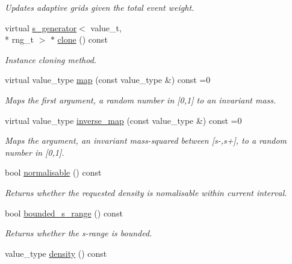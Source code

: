 \begin{DoxyCompactItemize}
\begin{DoxyCompactList}\small\item\em Updates adaptive grids given the total event weight. \end{DoxyCompactList}\item 
virtual \hyperlink{a00482}{s\-\_\-generator}$<$ value\-\_\-t, \\*
rng\-\_\-t $>$ $\ast$ \hyperlink{a00482_afd0da9539aa5f4e672e05e146fb09258}{clone} () const 
\begin{DoxyCompactList}\small\item\em Instance cloning method. \end{DoxyCompactList}\item 
virtual value\-\_\-type \hyperlink{a00482_a2b34a08ad07cf08d3d91fc6edb91eb0b}{map} (const value\-\_\-type \&) const =0
\begin{DoxyCompactList}\small\item\em Maps the first argument, a random number in \mbox{[}0,1\mbox{]} to an invariant mass. \end{DoxyCompactList}\item 
virtual value\-\_\-type \hyperlink{a00482_a5853a3d32e5a0901985040914f32141c}{inverse\-\_\-map} (const value\-\_\-type \&) const =0
\begin{DoxyCompactList}\small\item\em Maps the argument, an invariant mass-\/squared between \mbox{[}s-\/,s+\mbox{]}, to a random number in \mbox{[}0,1\mbox{]}. \end{DoxyCompactList}\item 
bool \hyperlink{a00482_af86cec8337971720b78497bbdaf05564}{normalisable} () const 
\begin{DoxyCompactList}\small\item\em Returns whether the requested density is nomalisable within current interval. \end{DoxyCompactList}\item 
\hypertarget{a00482_a044ca4d108509e6450ed262657509a84}{bool \hyperlink{a00482_a044ca4d108509e6450ed262657509a84}{bounded\-\_\-s\-\_\-range} () const }\label{a00482_a044ca4d108509e6450ed262657509a84}

\begin{DoxyCompactList}\small\item\em Returns whether the s-\/range is bounded. \end{DoxyCompactList}\item 
\hypertarget{a00482_a3f1d81d664ac177982781cf00f7527c0}{value\-\_\-type \hyperlink{a00482_a3f1d81d664ac177982781cf00f7527c0}{density} () const }\label{a00482_a3f1d81d664ac177982781cf00f7527c0}


\end{DoxyCompactItemize}
